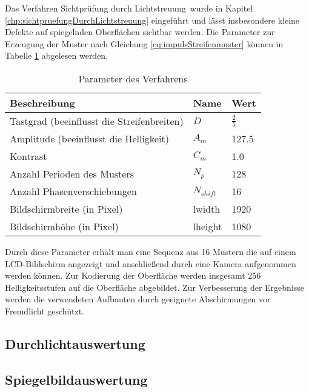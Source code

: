 Das Verfahren \glqq Sichtprüfung durch Lichtstreuung\grqq ~wurde in Kapitel \ref{chp:sichtpruefungDurchLichtstreuung} eingeführt und lässt insbesondere kleine Defekte auf spiegelnden Oberflächen sichtbar werden.
Die Parameter zur Erzeugung der Muster nach Gleichung \ref{eq:impulsStreifenmuster} können in Tabelle \ref{tab:paramSichtpruefung} abgelesen werden.

\begin{table}[H]
	\centering
	\begin{tabular}{lll}
		\hline 
		\textbf{Beschreibung} & \textbf{Name} & \textbf{Wert} \\ 
		\hline 
		Tastgrad (beeinflusst die Streifenbreiten) & $D$ & $\tfrac{2}{5}$ \\ 
		Amplitude (beeinflusst die Helligkeit) & $A_m$ & 127.5 \\ 
		Kontrast & $C_m$ & 1.0 \\ 
		Anzahl Perioden des Musters & $N_p$ & 128 \\
		Anzahl Phasenverschiebungen & $N_{shift}$ & 16 \\ 
		Bildschirmbreite (in Pixel) & \acrshort{lwidth} & 1920 \\
		Bildschirmhöhe (in Pixel) & \acrshort{lheight} & 1080 \\ 
		\hline 
	\end{tabular}
	\caption{Parameter des Verfahrens}
	\label{tab:paramSichtpruefung}
\end{table}

\noindent
Durch diese Parameter erhält man eine Sequenz aus 16 Mustern die auf einem LCD-Bildschirm angezeigt und anschließend durch eine Kamera aufgenommen werden können.
Zur Kodierung der Oberfläche werden insgesamt 256 Helligkeitsstufen auf die Oberfläche abgebildet.
Zur Verbesserung der Ergebnisse werden die verwendeten Aufbauten durch geeignete Abschirmungen vor Fremdlicht geschützt.

{
	\FloatBarrier
    \subsection{Durchlichtauswertung}
    \label{sub:durchlichtAuswertungLichtstreuung}
    
}

{
	\FloatBarrier
    \subsection{Spiegelbildauswertung}
    \label{sub:spiegelbildAuswertungLichtstreuung}
    
}